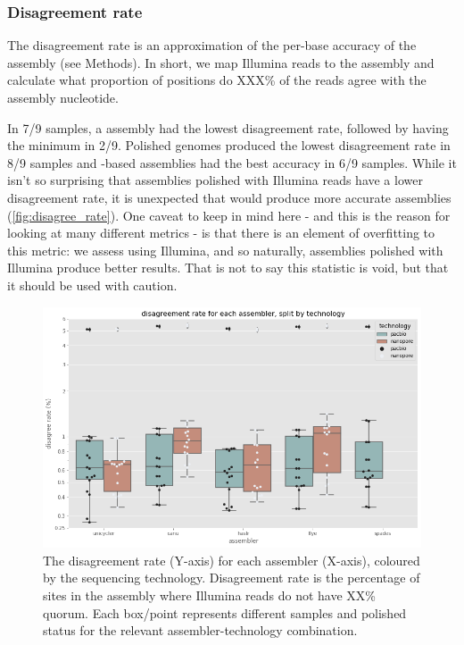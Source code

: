 \subsubsection{Disagreement rate}

The disagreement rate is an approximation of the per-base accuracy of the assembly (see Methods). In short, we map Illumina reads to the assembly and calculate what proportion of positions do XXX\% of the reads agree with the assembly nucleotide.  

In 7/9 samples, a  assembly had the lowest disagreement rate, followed by  having the minimum in 2/9. Polished genomes produced the lowest disagreement rate in 8/9 samples and \ont{}-based assemblies had the best accuracy in 6/9 samples. While it isn't so surprising that assemblies polished with Illumina reads have a lower disagreement rate, it is unexpected that \ont{} would produce more accurate assemblies (\autoref{fig:disagree_rate}). One caveat to keep in mind here - and this is the reason for looking at many different metrics - is that there is an element of overfitting to this metric: we assess using Illumina, and so naturally, assemblies polished with Illumina produce better results. That is not to say this statistic is void, but that it should be used with caution.



\begin{figure}
\includegraphics[width=1.0\textwidth]{Chapter2/Figs/disagree_rate.png}
\centering
\caption{The disagreement rate (Y-axis) for each assembler (X-axis), coloured by the sequencing technology. Disagreement rate is the percentage of sites in the assembly where Illumina reads do not have XX\% quorum. Each box/point represents different samples and polished status for the relevant assembler-technology combination.}
\label{fig:disagree_rate}
\end{figure}



